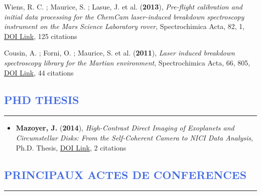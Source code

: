 \documentclass[11pt, a4paper, french]{article}
\begin{document}
\begin{etaremune}
 \item Wiens, R. C. ; Maurice, S. ; Lasue, J. et al. ({\bf2013}), {\it Pre-flight calibration and initial data processing for the ChemCam laser-induced breakdown spectroscopy instrument on the Mars Science Laboratory rover}, Spectrochimica Acta, 82, 1, \href{https://doi.org/10.1016/j.sab.2013.02.003}{DOI Link}, 125 citations

 \item Cousin, A. ; Forni, O. ; Maurice, S. et al. ({\bf2011}), {\it Laser induced breakdown spectroscopy library for the Martian environment}, Spectrochimica Acta, 66, 805, \href{https://doi.org/10.1016/j.sab.2011.10.004}{DOI Link}, 44 citations

 \end{etaremune}



\vspace{-0.5cm}
\textcolor{RoyalBlue}{\section{PHD THESIS}
\vspace{-0.25cm}\hrule}
\vspace{0.6cm}

\begin{itemize} \itemsep 0pt

\item {\bf Mazoyer, J.} ({\bf2014}), {\it High-Contrast Direct Imaging of Exoplanets and Circumstellar Disks: From the Self-Coherent Camera to NICI Data Analysis}, Ph.D. Thesis, \href{https://doi.org/10.5281/zenodo.58003}{DOI Link}, 2 citations

 \end{itemize}

\vspace{-0.5cm}
\textcolor{RoyalBlue}{\section{PRINCIPAUX ACTES DE CONFERENCES}
\vspace{-0.25cm}\hrule}
\vspace{0.6cm}
\end{document}

